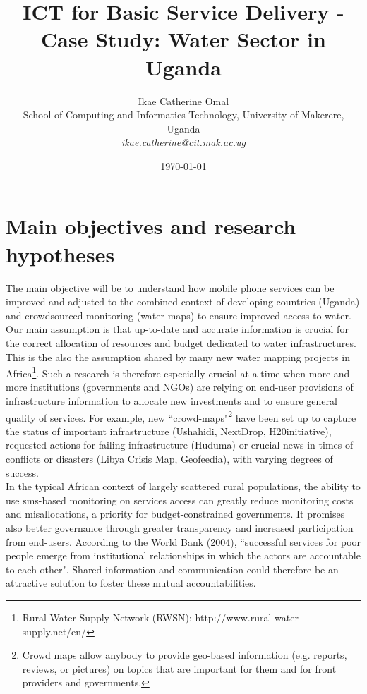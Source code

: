 \documentclass[11pt]{article}
\title{ICT for Basic Service Delivery - Case Study: Water Sector in Uganda}
\author{
\small{Ikae Catherine Omal}\\
\small{School of Computing and Informatics Technology, University of Makerere, Uganda}\\ \small{\textit{ikae.catherine@cit.mak.ac.ug}}\\
}
\date{\today}
\begin{document}
\maketitle

\begin{abstract}

\end{abstract}



\section{Main objectives and research hypotheses}\label{objectives}
The main objective will be to understand how mobile phone services can be improved and adjusted to the combined context of developing countries (Uganda) and crowdsourced monitoring (water maps) to ensure improved access to water. Our main assumption is that up-to-date and accurate information is crucial for the correct allocation of resources and budget dedicated to water infrastructures. This is the also the assumption shared by many new water mapping projects in Africa\footnote{Rural Water Supply Network (RWSN): http://www.rural-water-supply.net/en/}. Such a research is therefore especially crucial at a time when more and more institutions (governments and NGOs) are relying on end-user provisions of infrastructure information to allocate new investments and to ensure general quality of services. For example, new ``crowd-­maps"\footnote{Crowd maps allow anybody to provide geo-­based information (e.g. reports, reviews, or pictures) on topics that are important for them and for front providers and governments.} have been set up to capture the status of important infrastructure (Ushahidi, NextDrop, H20initiative), requested actions for failing infrastructure (Huduma) or crucial news in times of conflicts or disasters (Libya Crisis Map, Geofeedia), with varying degrees of success. 
\\
In the typical African context of largely scattered rural populations, the ability to use sms-based monitoring on services access can greatly reduce monitoring costs and misallocations, a priority for budget-constrained governments. It promises also better governance through greater transparency and increased participation from end-users. According to the World Bank (2004), ``successful services for poor people emerge from institutional relationships in which the actors are accountable to each other". Shared information and communication could therefore be an attractive solution to foster these mutual accountabilities. 
\end{document}
